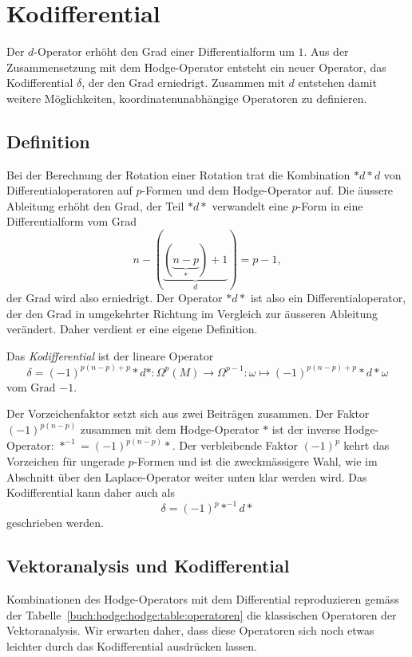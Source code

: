 %
%
%
\section{Kodifferential
\label{buch:hodge:section:kodifferential}}
Der $d$-Operator erhöht den Grad einer Differentialform um $1$.
Aus der Zusammensetzung mit dem Hodge-Operator entsteht ein neuer
Operator, das Kodifferential $\delta$, der den Grad erniedrigt.
Zusammen mit $d$ entstehen damit weitere Möglichkeiten,
koordinatenunabhängige Operatoren zu definieren.

%
%
\subsection{Definition}
Bei der Berechnung der Rotation einer Rotation trat die Kombination
${*}d{*}d$ von Differentialoperatoren auf $p$-Formen und dem
Hodge-Operator auf.
Die äussere Ableitung erhöht den Grad, der Teil ${*}d{*}$
verwandelt eine $p$-Form in eine Differentialform vom Grad
\[
n-(\underbrace{(\underbrace{n-p}_{*})+1}_{d})
=
p-1,
\]
der Grad wird also erniedrigt.
Der Operator ${*}d{*}$ ist also ein Differentialoperator, der den
Grad in umgekehrter Richtung im Vergleich zur äusseren Ableitung
verändert.
Daher verdient er eine eigene Definition.

\begin{definition}[Kodifferential]
\label{buch:hodge:kodifferential:def:delta}
Das {\em Kodifferential} ist der lineare Operator
%
%
\[
\delta
=
(-1)^{p(n-p)+p}
{\ast}d{\ast}
\colon
\Omega^p(M)\to\Omega^{p-1}
:
\omega \mapsto (-1)^{p(n-p)+p}{\ast}d{\ast}\omega
\]
vom Grad $-1$.
\end{definition}

Der Vorzeichenfaktor setzt sich aus zwei Beiträgen zusammen.
Der Faktor $(-1)^{p(n-p)}$ zusammen mit dem Hodge-Operator ${\ast}$
ist der inverse Hodge-Operator: $\ast^{-1} = (-1)^{p(n-p)}{\ast}$.
Der verbleibende Faktor $(-1)^p$ kehrt das Vorzeichen für ungerade
$p$-Formen und ist die zweckmässigere Wahl, wie im Abschnitt über
den Laplace-Operator weiter unten klar werden wird.
Das Kodifferential kann daher auch als
\[
\delta
=
(-1)^p
{\ast}^{-1}d{\ast}
\]
geschrieben werden.

%
%
\subsection{Vektoranalysis und Kodifferential}
Kombinationen des Hodge-Operators mit dem Differential reproduzieren
gemäss der Tabelle~\ref{buch:hodge:hodge:table:operatoren} die 
klassischen Operatoren der Vektoranalysis.
Wir erwarten daher, dass diese Operatoren sich noch etwas leichter
durch das Kodifferential ausdrücken lassen.


